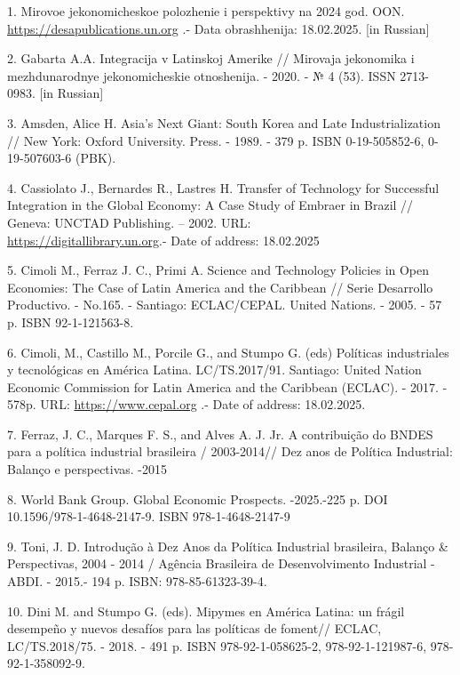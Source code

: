 \begin{references}
1. Mirovoe jekonomicheskoe polozhenie i perspektivy na 2024 god. OON.
\href{https://desapublications.un.org/sites/default/files/publications/2024-03/WESP\%202024_Executive\%20Summary_Russian_0.pdf}{https://desapublications.un.org}
.- Data obrashhenija:
18.02.2025. {[}in Russian{]}

2. Gabarta A.A. Integracija v Latinskoj Amerike // Mirovaja jekonomika i
mezhdunarodnye jekonomich\-eskie otnoshenija. - 2020. - № 4 (53). ISSN
2713-0983. {[}in Russian{]}

3. Amsden, Alice H. Asia's Next Giant: South Korea and Late
Industrialization // New York: Oxford University. Press. - 1989. - 379
p. ISBN 0-19-505852-6, 0-19-507603-6 (PBK).

4. Cassiolato J., Bernardes R., Lastres H. Transfer of Technology for
Successful Integration in the Global Economy: A Case Study of Embraer in
Brazil // Geneva: UNCTAD Publishing. -- 2002. URL:\\
\href{https://digitallibrary.un.org/record/479842?v=pdf}{https://digitallibrary.un.org}.- Date of
address: 18.02.2025

5. Cimoli M., Ferraz J. C., Primi A. Science and Technology Policies in
Open Economies: The Case of Latin America and the Caribbean // Serie
Desarrollo Productivo. - No.165. - Santiago: ECLAC/CEPAL. United
Nations. - 2005. - 57 p. ISBN 92-1-121563-8.

6. Cimoli, M., Castillo M., Porcile G., and Stumpo G. (eds) Políticas
industriales y tecnológicas en América Latina. LC/TS.2017/91. Santiago:
United Nation Economic Commission for Latin America and the Carib\-bean
(ECLAC). - 2017. - 578p. URL:
\href{https://www.cepal.org/es/publicaciones/42363-politicasindustriales-tecnologicas-america-latina}{https://www.cepal.org} .-
Date of address: 18.02.2025.

7. Ferraz, J. C., Marques F. S., and Alves A. J. Jr. A contribuição do
BNDES para a política industrial brasileira / 2003-2014// Dez anos de
Política Industrial: Balanço e perspectivas. -2015

8. World Bank Group. Global Economic Prospects. -2025.-225 p. DOI
10.1596/978-1-4648-2147-9. ISBN 978-1-4648-2147-9

9. Toni, J. D. Introdução à Dez Anos da Política Industrial brasileira,
Balanço \& Perspectivas, 2004 - 2014 / Agência Brasileira de
Desenvolvimento Industrial - ABDI. - 2015.- 194 p. ISBN:
978-85-61323-39-4.

10. Dini M. and Stumpo G. (eds). Mipymes en América Latina: un frágil
desempeño y nuevos desafíos para las políticas de foment// ECLAC,
LC/TS.2018/75. - 2018. - 491 p. ISBN 978-92-1-058625-2,
978-92-1-121987-6, 978-92-1-358092-9.


\end{references}
